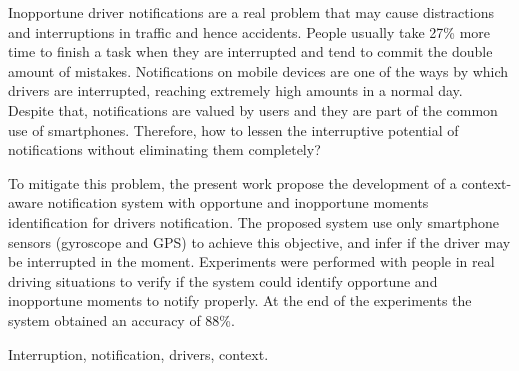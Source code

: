 Inopportune driver notifications are a real problem that may cause distractions and interruptions in traffic and
hence accidents. People usually take 27\% more time to finish a task when they are interrupted and tend to commit the
double amount of mistakes. Notifications on mobile devices are one of the ways by which drivers are interrupted,
reaching extremely high amounts in a normal day. Despite that, notifications are valued by users and they are
part of the common use of smartphones. Therefore, how to lessen the interruptive potential of notifications without
eliminating them completely?

To mitigate this problem, the present work propose the development of a context-aware notification system with opportune
and inopportune moments identification for drivers notification. The proposed system use only smartphone sensors (gyroscope
and GPS) to achieve this objective, and infer if the driver may be interrupted in the moment. Experiments were performed with
people in real driving situations to verify if the system could identify opportune and inopportune moments to notify properly.
At the end of the experiments the system obtained an accuracy of 88\%.

\begin{keywords}
Interruption, notification, drivers, context.
\end{keywords}
